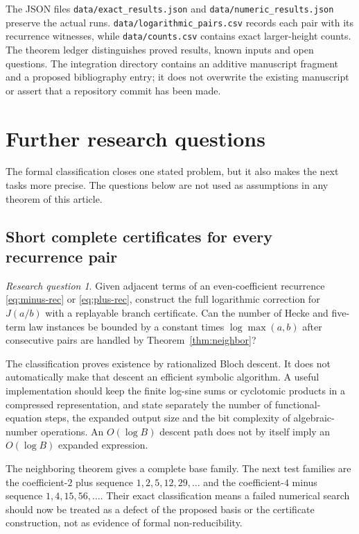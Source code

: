 \documentclass[11pt]{article}
\numberwithin{equation}{section}
\theoremstyle{definition}
\theoremstyle{remark}
\newtheorem{question}[theorem]{Research question}
\begin{document}
The JSON files \nolinkurl{data/exact_results.json} and
\nolinkurl{data/numeric_results.json} preserve the actual runs.
\nolinkurl{data/logarithmic_pairs.csv} records each pair with its
recurrence witnesses, while \nolinkurl{data/counts.csv} contains exact
larger-height counts. The theorem ledger distinguishes proved results,
known inputs and open questions. The integration directory contains an
additive manuscript fragment and a proposed bibliography entry; it does
not overwrite the existing manuscript or assert that a repository commit
has been made.


\section{Further research questions}
\label{sec:future}

The formal classification closes one stated problem, but it also makes
the next tasks more precise. The questions below are not used as
assumptions in any theorem of this article.

\subsection{Short complete certificates for every recurrence pair}

\begin{question}\label{question:certificates}
Given adjacent terms of an even-coefficient recurrence
\eqref{eq:minus-rec} or \eqref{eq:plus-rec}, construct the full
logarithmic correction for $J(a/b)$ with a replayable branch certificate.
Can the number of Hecke and five-term law instances be bounded by a
constant times $\log\max(a,b)$ after consecutive pairs are handled by
Theorem~\ref{thm:neighbor}?
\end{question}

The classification proves existence by rationalized Bloch descent. It
does not automatically make that descent an efficient symbolic
algorithm. A useful implementation should keep the finite log-sine sums
or cyclotomic products in a compressed representation, and state
separately the number of functional-equation steps, the expanded output
size and the bit complexity of algebraic-number operations. An
$O(\log B)$ descent path does not by itself imply an $O(\log B)$
expanded expression.

The neighboring theorem gives a complete base family. The next test
families are the coefficient-$2$ plus sequence
$1,2,5,12,29,\ldots$ and the coefficient-$4$ minus sequence
$1,4,15,56,\ldots$. Their exact classification means a failed numerical
search should now be treated as a defect of the proposed basis or the
certificate construction, not as evidence of formal non-reducibility.
\end{document}
